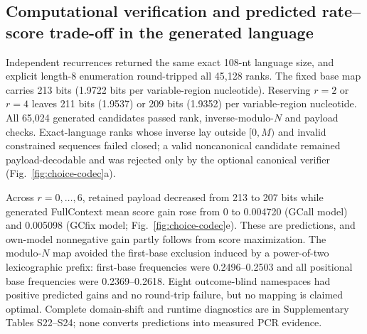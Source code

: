 \documentclass[10pt]{article}
\begin{document}
\subsection{Computational verification and predicted rate--score trade-off in the generated language}

Independent recurrences returned the same exact 108-nt language size, and explicit length-8 enumeration round-tripped all 45,128 ranks. The fixed base map carries 213 bits (1.9722 bits per variable-region nucleotide). Reserving $r=2$ or $r=4$ leaves 211 bits (1.9537) or 209 bits (1.9352) per variable-region nucleotide. All 65,024 generated candidates passed rank, inverse-modulo-$N$ and payload checks. Exact-language ranks whose inverse lay outside $[0,M)$ and invalid constrained sequences failed closed; a valid noncanonical candidate remained payload-decodable and was rejected only by the optional canonical verifier (Fig.~\ref{fig:choice-codec}a).

Across $r=0,\ldots,6$, retained payload decreased from 213 to 207 bits while generated FullContext mean score gain rose from 0 to 0.004720 (GCall model) and 0.005098 (GCfix model; Fig.~\ref{fig:choice-codec}e). These are predictions, and own-model nonnegative gain partly follows from score maximization. The modulo-$N$ map avoided the first-base exclusion induced by a power-of-two lexicographic prefix: first-base frequencies were 0.2496--0.2503 and all positional base frequencies were 0.2369--0.2618. Eight outcome-blind namespaces had positive predicted gains and no round-trip failure, but no mapping is claimed optimal. Complete domain-shift and runtime diagnostics are in Supplementary Tables S22--S24; none converts predictions into measured PCR evidence.
\end{document}
